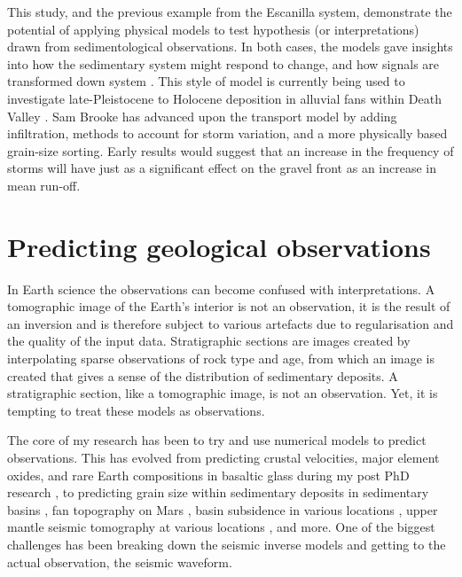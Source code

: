 This study, and the previous example from the Escanilla system, demonstrate the potential of applying physical models to test hypothesis (or interpretations) drawn from sedimentological observations. In both cases, the models gave insights into how the sedimentary system might respond to change, and how signals are transformed down system \citep{armitage-etal-ngeo-2011}. This style of model is currently being used to investigate late-Pleistocene to Holocene deposition in alluvial fans within Death Valley \citep[see][]{brooke-etal-2018}. Sam Brooke has advanced upon the transport model by adding infiltration, methods to account for storm variation, and a more physically based grain-size sorting. Early results would suggest that an increase in the frequency of storms will have just as a significant effect on the gravel front as an increase in mean run-off. 

\section{Predicting geological observations}

In Earth science the observations can become confused with interpretations. A tomographic image of the Earth's interior is not an observation, it is the result of an inversion and is therefore subject to various artefacts due to regularisation and the quality of the input data. Stratigraphic sections are images created by interpolating sparse observations of rock type and age, from which an image is created that gives a sense of the distribution of sedimentary deposits. A stratigraphic section, like a tomographic image, is not an observation. Yet, it is tempting to treat these models as observations.

The core of my research has been to try and use numerical models to predict observations. This has evolved from predicting crustal velocities, major element oxides, and rare Earth compositions in basaltic glass during my post PhD research \citep{armitage-etal-2010,armitage-etal-g3-2011}, to predicting grain size within sedimentary deposits in sedimentary basins \citep[e.g.][]{armitage-etal-ngeo-2011,armitage-etal-2015,armitage-etal-br-2018}, fan topography on Mars \citep{armitage-etal-grl-2011}, basin subsidence in various locations \citep[e.g.][]{armitage-2010,armitage-etal-jgr-2013,petersen-etal-2015}, upper mantle seismic tomography at various locations \citep[e.g.][]{goes-etal-2012,armitage-etal-2015}, and more. One of the biggest challenges has been breaking down the seismic inverse models and getting to the actual observation, the seismic waveform.

